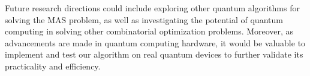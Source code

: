 Future research directions could include exploring other quantum algorithms for solving the MAS problem, as well as investigating the potential of quantum computing in solving other combinatorial optimization problems. Moreover, as advancements are made in quantum computing hardware, it would be valuable to implement and test our algorithm on real quantum devices to further validate its practicality and efficiency.

